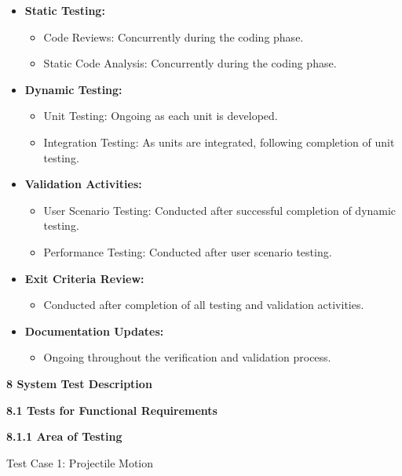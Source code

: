 \documentclass[
]{article}
\begin{document}
\begin{itemize}
\item
  \textbf{Static Testing:}

  \begin{itemize}
  \item
    Code Reviews: Concurrently during the coding phase.
  \item
    Static Code Analysis: Concurrently during the coding phase.
  \end{itemize}
\item
  \textbf{Dynamic Testing:}

  \begin{itemize}
  \item
    Unit Testing: Ongoing as each unit is developed.
  \item
    Integration Testing: As units are integrated, following completion
    of unit testing.
  \end{itemize}
\item
  \textbf{Validation Activities:}

  \begin{itemize}
  \item
    User Scenario Testing: Conducted after successful completion of
    dynamic testing.
  \item
    Performance Testing: Conducted after user scenario testing.
  \end{itemize}
\item
  \textbf{Exit Criteria Review:}

  \begin{itemize}
  \item
    Conducted after completion of all testing and validation activities.
  \end{itemize}
\item
  \textbf{Documentation Updates:}

  \begin{itemize}
  \item
    Ongoing throughout the verification and validation process.
  \end{itemize}
\end{itemize}

\protect\hypertarget{Am}{}{}\textbf{8 System Test Description}

\protect\hypertarget{Am1}{}{}\textbf{8.1 Tests for Functional
Requirements}

\textbf{8.1.1 Area of Testing}

Test Case 1: Projectile Motion
\end{document}
